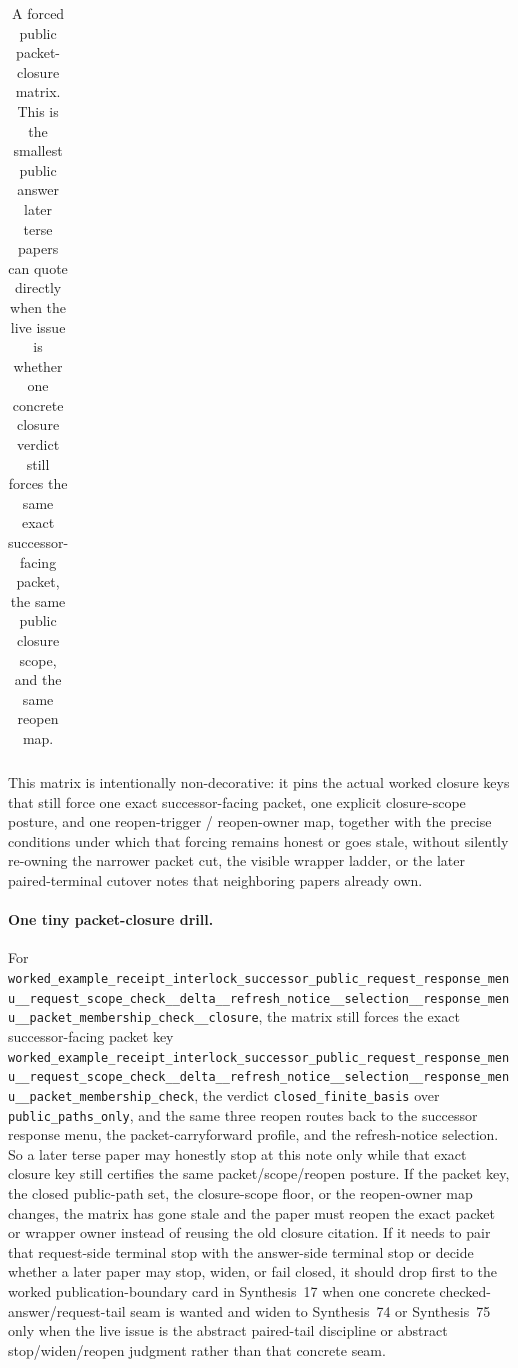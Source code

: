 \documentclass[11pt]{article}
\begin{document}
\begin{table}[t]
\begin{tabularx}{\linewidth}{@{}lX@{}}
\bottomrule
\end{tabularx}
\caption{A forced public packet-closure matrix. This is the smallest public answer later terse papers can quote directly when the live issue is whether one concrete closure verdict still forces the same exact successor-facing packet, the same public closure scope, and the same reopen map.}
\label{tab:forced-public-packet-closure-matrix}
\end{table}

This matrix is intentionally non-decorative: it pins the actual worked closure keys that still force one exact successor-facing packet, one explicit closure-scope posture, and one reopen-trigger / reopen-owner map, together with the precise conditions under which that forcing remains honest or goes stale, without silently re-owning the narrower packet cut, the visible wrapper ladder, or the later paired-terminal cutover notes that neighboring papers already own.\cite{series:workedexample}

\paragraph{One tiny packet-closure drill.}
For \nolinkurl{worked_example_receipt_interlock_successor_public_request_response_menu__request_scope_check__delta__refresh_notice__selection__response_menu__packet_membership_check__closure}, the matrix still forces the exact successor-facing packet key \nolinkurl{worked_example_receipt_interlock_successor_public_request_response_menu__request_scope_check__delta__refresh_notice__selection__response_menu__packet_membership_check}, the verdict \nolinkurl{closed_finite_basis} over \nolinkurl{public_paths_only}, and the same three reopen routes back to the successor response menu, the packet-carryforward profile, and the refresh-notice selection. So a later terse paper may honestly stop at this note only while that exact closure key still certifies the same packet/scope/reopen posture. If the packet key, the closed public-path set, the closure-scope floor, or the reopen-owner map changes, the matrix has gone stale and the paper must reopen the exact packet or wrapper owner instead of reusing the old closure citation. If it needs to pair that request-side terminal stop with the answer-side terminal stop or decide whether a later paper may stop, widen, or fail closed, it should drop first to the worked publication-boundary card in Synthesis~17 when one concrete checked-answer/request-tail seam is wanted and widen to Synthesis~74 or Synthesis~75 only when the live issue is the abstract paired-tail discipline or abstract stop/widen/reopen judgment rather than that concrete seam.\cite{series:workedexample}
\end{document}

